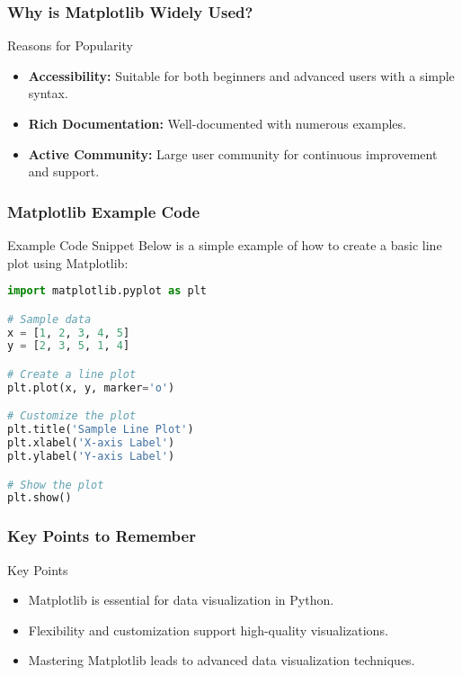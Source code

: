 \documentclass[aspectratio=169]{beamer}
\begin{document}
\begin{frame}[fragile]
    \frametitle{Why is Matplotlib Widely Used?}
    \begin{block}{Reasons for Popularity}
        \begin{itemize}
            \item \textbf{Accessibility:} Suitable for both beginners and advanced users with a simple syntax.
            \item \textbf{Rich Documentation:} Well-documented with numerous examples.
            \item \textbf{Active Community:} Large user community for continuous improvement and support.
        \end{itemize}
    \end{block}
\end{frame}

\begin{frame}[fragile]
    \frametitle{Matplotlib Example Code}
    \begin{block}{Example Code Snippet}
        Below is a simple example of how to create a basic line plot using Matplotlib:
        \begin{lstlisting}[language=Python]
import matplotlib.pyplot as plt

# Sample data
x = [1, 2, 3, 4, 5]
y = [2, 3, 5, 1, 4]

# Create a line plot
plt.plot(x, y, marker='o')

# Customize the plot
plt.title('Sample Line Plot')
plt.xlabel('X-axis Label')
plt.ylabel('Y-axis Label')

# Show the plot
plt.show()
        \end{lstlisting}
    \end{block}
\end{frame}

\begin{frame}[fragile]
    \frametitle{Key Points to Remember}
    \begin{block}{Key Points}
        \begin{itemize}
            \item Matplotlib is essential for data visualization in Python.
            \item Flexibility and customization support high-quality visualizations.
            \item Mastering Matplotlib leads to advanced data visualization techniques.
        \end{itemize}
    \end{block}
\end{frame}
\end{document}
